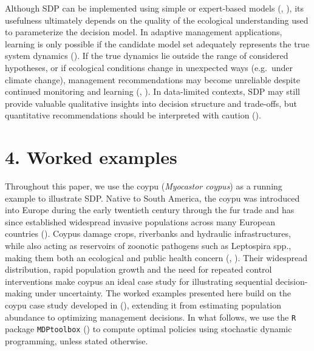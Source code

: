 \documentclass[
  11pt,
  a4paper,
]{article}
\begin{document}
Although SDP can be implemented using simple or expert-based models (, ), its usefulness ultimately depends on the quality of the ecological understanding used to parameterize the decision model. In adaptive management applications, learning is only possible if the candidate model set adequately represents the true system dynamics (). If the true dynamics lie outside the range of considered hypotheses, or if ecological conditions change in unexpected ways (e.g.~under climate change), management recommendations may become unreliable despite continued monitoring and learning (, ). In data-limited contexts, SDP may still provide valuable qualitative insights into decision structure and trade-offs, but quantitative recommendations should be interpreted with caution ().

\section{4. Worked examples}\label{worked-examples}

Throughout this paper, we use the coypu (\emph{Myocastor coypus}) as a running example to illustrate SDP. Native to South America, the coypu was introduced into Europe during the early twentieth century through the fur trade and has since established widespread invasive populations across many European countries (). Coypus damage crops, riverbanks and hydraulic infrastructures, while also acting as reservoirs of zoonotic pathogens such as Leptospira spp., making them both an ecological and public health concern (, ). Their widespread distribution, rapid population growth and the need for repeated control interventions make coypus an ideal case study for illustrating sequential decision-making under uncertainty. The worked examples presented here build on the coypu case study developed in (), extending it from estimating population abundance to optimizing management decisions. In what follows, we use the \texttt{R} package \texttt{MDPtoolbox} () to compute optimal policies using stochastic dynamic programming, unless stated otherwise.
\end{document}
